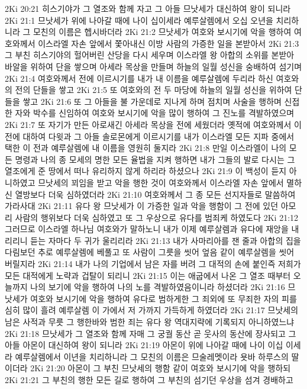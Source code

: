 2Ki 20:21  히스기야가 그 열조와 함께 자고 그 아들 므낫세가 대신하여 왕이 되니라
2Ki 21:1  므낫세가 위에 나아갈 때에 나이 십이세라 예루살렘에서 오십 오년을 치리하니라 그 모친의 이름은 헵시바더라
2Ki 21:2  므낫세가 여호와 보시기에 악을 행하여 여호와께서 이스라엘 자손 앞에서 쫓아내신 이방 사람의 가증한 일을 본받아서
2Ki 21:3  그 부친 히스기야의 헐어버린 산당을 다시 세우며 이스라엘 왕 아합의 소위를 본받아 바알을 위하여 단을 쌓으며 아세라 목상을 만들며 하늘의 일월 성신을 숭배하여 섬기며
2Ki 21:4  여호와께서 전에 이르시기를 내가 내 이름을 예루살렘에 두리라 하신 여호와의 전의 단들을 쌓고
2Ki 21:5  또 여호와의 전 두 마당에 하늘의 일월 성신을 위하여 단들을 쌓고
2Ki 21:6  또 그 아들을 불 가운데로 지나게 하며 점치며 사술을 행하며 신접한 자와 박수를 신임하여 여호와 보시기에 악을 많이 행하여 그 진노를 격발하였으며
2Ki 21:7  또 자기가 만든 아로새긴 아세라 목상을 전에 세웠더라 옛적에 여호와께서 이 전에 대하여 다윗과 그 아들 솔로몬에게 이르시기를 내가 이스라엘 모든 지파 중에서 택한 이 전과 예루살렘에 내 이름을 영원히 둘지라
2Ki 21:8  만일 이스라엘이 나의 모든 명령과 나의 종 모세의 명한 모든 율법을 지켜 행하면 내가 그들의 발로 다시는 그 열조에게 준 땅에서 떠나 유리하지 않게 하리라 하셨으나
2Ki 21:9  이 백성이 듣지 아니하였고 므낫세의 꾀임을 받고 악을 행한 것이 여호와께서 이스라엘 자손 앞에서 멸하신 열방보다 더욱 심하였더라
2Ki 21:10  여호와께서 그 종 모든 선지자들로 말씀하여 가라사대
2Ki 21:11  유다 왕 므낫세가 이 가증한 일과 악을 행함이 그 전에 있던 아모리 사람의 행위보다 더욱 심하였고 또 그 우상으로 유다를 범죄케 하였도다
2Ki 21:12  그러므로 이스라엘 하나님 여호와가 말하노니 내가 이제 예루살렘과 유다에 재앙을 내리리니 듣는 자마다 두 귀가 울리리라
2Ki 21:13  내가 사마리아를 잰 줄과 아합의 집을 다림보던 추로 예루살렘에 베풀고 또 사람이 그릇을 씻어 엎음 같이 예루살렘을 씻어 버릴지라
2Ki 21:14  내가 나의 기업에서 남은 자를 버려 그 대적의 손에 붙인즉 저희가 모든 대적에게 노략과 겁탈이 되리니
2Ki 21:15  이는 애굽에서 나온 그 열조 때부터 오늘까지 나의 보기에 악을 행하여 나의 노를 격발하였음이니라 하셨더라
2Ki 21:16  므낫세가 여호와 보시기에 악을 행하여 유다로 범하게한 그 죄외에 또 무죄한 자의 피를 심히 많이 흘려 예루살렘 이 가에서 저 가까지 가득하게 하였더라
2Ki 21:17  므낫세의 남은 사적과 무릇 그 행한바와 범한 죄는 유다 왕 역대지략에 기록되지 아니하였느냐
2Ki 21:18  므낫세가 그 열조와 함께 자매 그 궁궐 동산 곧 웃사의 동산에 장사되고 그 아들 아몬이 대신하여 왕이 되니라
2Ki 21:19  아몬이 위에 나아갈 때에 나이 이십 이세라 예루살렘에서 이년을 치리하니라 그 모친의 이름은 므술레멧이라 욧바 하루스의 딸이더라
2Ki 21:20  아몬이 그 부친 므낫세의 행함 같이 여호와 보시기에 악을 행하되
2Ki 21:21  그 부친의 행한 모든 길로 행하여 그 부친의 섬기던 우상을 섬겨 경배하고
